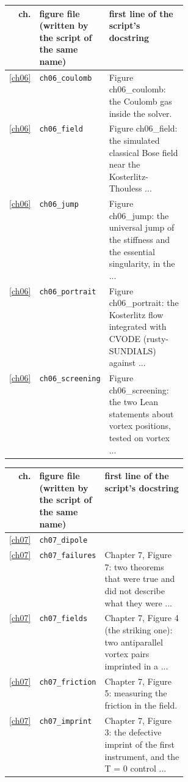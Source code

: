 \begin{center}\footnotesize\setlength{\tabcolsep}{3pt}\begin{tabularx}{\linewidth}{@{}r>{\raggedright}p{0.34\linewidth}>{\raggedright\arraybackslash}X@{}}\toprule ch. & figure file (written by the script of the same name) & first line of the script's docstring\\\midrule
\ref{ch06} & \texttt{ch06\_\allowbreak{}coulomb} & Figure ch06\_\allowbreak{}coulomb: the Coulomb gas inside the solver.\allowbreak{} \\
\ref{ch06} & \texttt{ch06\_\allowbreak{}field} & Figure ch06\_\allowbreak{}field: the simulated classical Bose field near the Kosterlitz-\allowbreak{}Thouless .\allowbreak{}.\allowbreak{}.\allowbreak{} \\
\ref{ch06} & \texttt{ch06\_\allowbreak{}jump} & Figure ch06\_\allowbreak{}jump: the universal jump of the stiffness and the essential singularity,\allowbreak{} in the .\allowbreak{}.\allowbreak{}.\allowbreak{} \\
\ref{ch06} & \texttt{ch06\_\allowbreak{}portrait} & Figure ch06\_\allowbreak{}portrait: the Kosterlitz flow integrated with CVODE (rusty-\allowbreak{}SUNDIALS) against .\allowbreak{}.\allowbreak{}.\allowbreak{} \\
\ref{ch06} & \texttt{ch06\_\allowbreak{}screening} & Figure ch06\_\allowbreak{}screening: the two Lean statements about vortex positions,\allowbreak{} tested on vortex .\allowbreak{}.\allowbreak{}.\allowbreak{} \\
\bottomrule\end{tabularx}\end{center}
\begin{center}\footnotesize\setlength{\tabcolsep}{3pt}\begin{tabularx}{\linewidth}{@{}r>{\raggedright}p{0.34\linewidth}>{\raggedright\arraybackslash}X@{}}\toprule ch. & figure file (written by the script of the same name) & first line of the script's docstring\\\midrule
\ref{ch07} & \texttt{ch07\_\allowbreak{}dipole} &  \\
\ref{ch07} & \texttt{ch07\_\allowbreak{}failures} & Chapter 7,\allowbreak{} Figure 7: two theorems that were true and did not describe what they were .\allowbreak{}.\allowbreak{}.\allowbreak{} \\
\ref{ch07} & \texttt{ch07\_\allowbreak{}fields} & Chapter 7,\allowbreak{} Figure 4 (the striking one): two antiparallel vortex pairs imprinted in a .\allowbreak{}.\allowbreak{}.\allowbreak{} \\
\ref{ch07} & \texttt{ch07\_\allowbreak{}friction} & Chapter 7,\allowbreak{} Figure 5: measuring the friction in the field.\allowbreak{} \\
\ref{ch07} & \texttt{ch07\_\allowbreak{}imprint} & Chapter 7,\allowbreak{} Figure 3: the defective imprint of the first instrument,\allowbreak{} and the T = 0 control .\allowbreak{}.\allowbreak{}.\allowbreak{} \\
\bottomrule\end{tabularx}\end{center}
